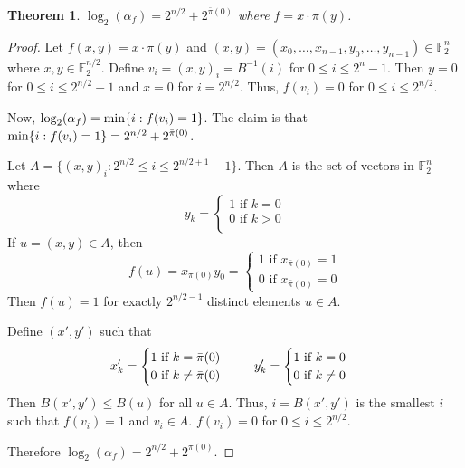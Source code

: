 \documentclass[english]{article}
\def\gftwo{\mathbb{F}_2}
\theoremstyle{plain}
\newtheorem{theorem}{Theorem}[subsection]
\theoremstyle{definition}
\theoremstyle{remark}
\begin{document}
\begin{theorem}
  $\log_2(\alpha_f)=2^{n/2}+2^{\bar{\pi}(0)} $ where
  $f=x\cdot\pi(y)$.
\end{theorem}
\begin{proof}
  \par Let $f(x,y)=x\cdot\pi(y)$ and
  $(x,y)=(x_0,\dots,x_{n-1},y_0,\dots,y_{n-1})\in\gftwo^n$ where
  $x,y\in\gftwo^{n/2}$. Define $v_i=(x,y)_i=B^{-1}(i)$ for $0\leq i\leq
  2^{n}-1$. Then $y=0$ for $0\leq i\leq2^{n/2}-1$ and $x=0$ for $i=2^{n/2}$.
  Thus, $f(v_i)=0$ for $0\leq i \leq 2^{n/2}$.
  \par Now, $\log_2(\alpha_f)={\rm min}\{i:f(v_i)=1\}$. The claim is that
  ${\rm min}\{i:f(v_i)=1\}=2^{n/2}+2^{\bar{\pi}(0)}$.
  \par Let $A=\{(x,y)_i:2^{n/2}\leq i\leq 2^{n/2+1}-1\}$. Then $A$ is the set of
  vectors in $\gftwo^n$ where
  \[
    y_k=
    \begin{cases}
      1 \text{ if } k=0\\
      0 \text{ if } k>0\\
    \end{cases}
  \]
  If $u=(x,y)\in A$, then
  \[
    f(u)=x_{\bar{\pi}(0)}y_0=
    \begin{cases}
      1 \text{ if } x_{\bar{\pi}(0)}=1\\
      0 \text{ if } x_{\bar{\pi}(0)}=0
    \end{cases}
  \]
  Then $f(u)=1$ for exactly $2^{n/2-1}$ distinct elements $u\in A$.
  \par Define $(x',y')$ such that
  \[
    x_k'=
    \begin{cases}
      1 \text{ if } k=\bar{\pi}(0)\\
      0 \text{ if } k\not=\bar{\pi}(0)
    \end{cases}
    \hspace{5mm}
    y_k'=
    \begin{cases}
      1 \text{ if } k=0\\
      0 \text{ if } k\not=0
    \end{cases}
  \]
  Then $B(x',y')\leq B(u)$ for all $u\in A$. Thus, $i=B(x',y')$ is the smallest
  $i$ such that $f(v_i)=1$ and $v_i\in A$. $f(v_i)=0$ for $0\leq i\leq 2^{n/2}$.
  \par Therefore $\log_2(\alpha_f)=2^{n/2}+2^{\bar{\pi}(0)}$.
\end{proof}

\nocite{*}
{}

\end{document}
